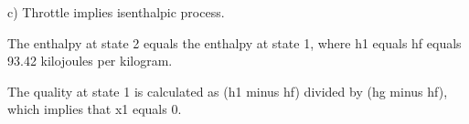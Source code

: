 c) Throttle implies isenthalpic process.

The enthalpy at state 2 equals the enthalpy at state 1, where h1 equals hf equals 93.42 kilojoules per kilogram.

The quality at state 1 is calculated as (h1 minus hf) divided by (hg minus hf), which implies that x1 equals 0.